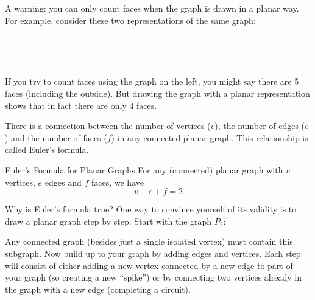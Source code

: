 \documentclass[12pt]{article}
\begin{document}
A warning: you can only count faces when the graph is drawn in a planar way.  For example, consider these two representations of the same graph:

\begin{center}
 ~ \hfill
  \hfill
  \hfill ~
\end{center}

If you try to count faces using the graph on the left, you might say there are 5 faces (including the outside).  But drawing the graph with a planar representation shows that in fact there are only 4 faces.



There is a connection between the number of vertices ($v$), the number of edges ($e$) and the number of faces ($f$) in any connected planar graph.  This relationship is called Euler's formula.

\begin{defbox}{Euler's Formula for Planar Graphs}
For any (connected) planar graph with $v$ vertices, $e$ edges and $f$ faces, we have
\[v-e + f = 2\]
\end{defbox}

Why is Euler's formula true?  One way to convince yourself of its validity is to draw a planar graph step by step.  Start with the graph $P_2$:

\begin{center}
\end{center}

Any connected graph (besides just a single isolated vertex) must contain this subgraph.  Now build up to your graph by adding edges and vertices.  Each step will consist of either adding a new vertex connected by a new edge to part of your graph (so creating a new ``spike'') or by connecting two vertices already in the graph with a new edge (completing a circuit).
\end{document}
